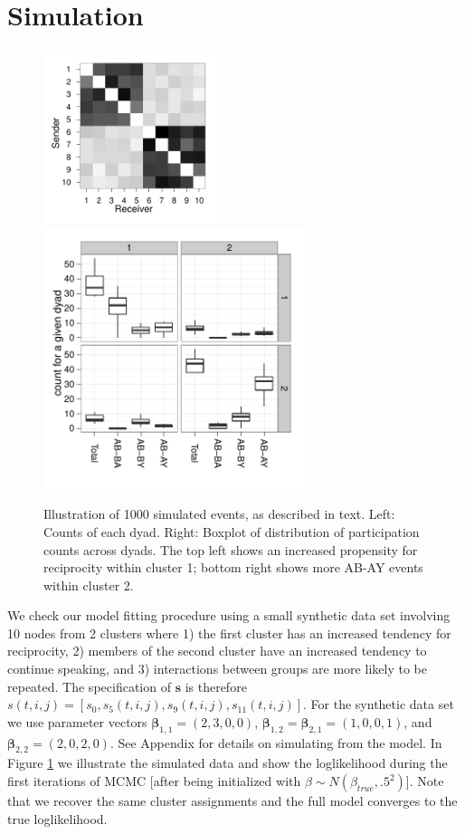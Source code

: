 \documentclass[11pt]{article}
\begin{document}
\section{Simulation}
\begin{figure}
\center
\includegraphics[width=2in]{../figs/synthetic/mat.pdf}
\includegraphics[width=3in]{../figs/synthetic/counts.pdf}
\caption{Illustration of 1000 simulated events, as described in text. Left: Counts of each dyad. Right: Boxplot of distribution of participation counts across dyads.  The top left shows an increased propensity for reciprocity within cluster 1; bottom right shows more AB-AY events within cluster 2.}
\label{fig:syncounts}
\end{figure}

We check our model fitting procedure using a small synthetic data set involving 10 nodes from 2 clusters where 1) the first cluster has an increased tendency for reciprocity, 2) members of the second cluster have an increased tendency to continue speaking, and 3) interactions between groups are more likely to be repeated.  The specification of $\textbf{s}$ is therefore $s(t,i,j) = [s_0, s_{5}(t,i,j), s_{9}(t,i,j), s_{11}(t,i,j)]$.  For the synthetic data set we use parameter vectors $\boldsymbol{\beta}_{1,1} = (2,3,0,0)$,  $\boldsymbol{\beta}_{1,2} = \boldsymbol{\beta}_{2,1} = (1,0,0,1)$, and $\boldsymbol{\beta}_{2,2} = (2,0,2,0)$.  See Appendix for details on simulating from the model.  In Figure \ref{fig:syncounts} we illustrate the simulated data and show the loglikelihood during the first iterations of MCMC [after being initialized with $\beta \sim N(\beta_{true},.5^2)$].  Note that we recover the same cluster assignments and the full model converges to the true loglikelihood.
\end{document}

